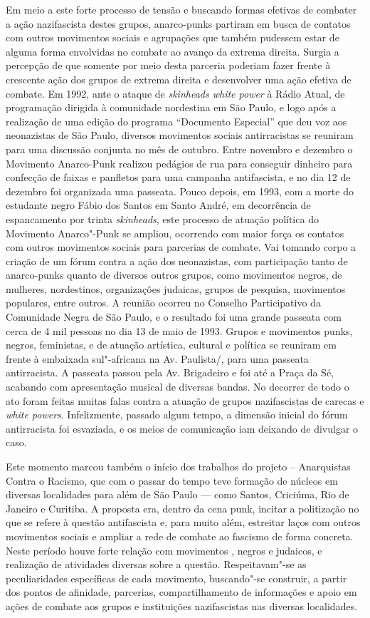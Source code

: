 Em meio a este forte processo de tensão e buscando formas efetivas de combater a ação nazifascista destes grupos, anarco-punks partiram em busca de contatos com outros movimentos sociais e agrupações que também pudessem estar de alguma forma envolvidas no combate ao avanço da extrema direita. Surgia a percepção de que somente por meio desta parceria poderiam fazer frente à crescente ação dos grupos de extrema direita e desenvolver uma ação efetiva de combate. Em 1992, ante o ataque de \emph{skinheads white power} à Rádio Atual, de programação dirigida à comunidade nordestina em São Paulo, e logo após a realização de uma edição do programa ``Documento Especial'' que deu voz aos neonazistas de São Paulo, diversos movimentos sociais antirracistas se reuniram para uma discussão conjunta no mês de outubro. Entre novembro e dezembro o Movimento Anarco-Punk realizou pedágios de rua para conseguir dinheiro para confecção de faixas e panfletos para uma campanha antifascista, e no dia 12 de dezembro foi organizada uma passeata. Pouco depois, em 1993, com a morte do estudante negro Fábio dos Santos em Santo André, em decorrência de espancamento por trinta \emph{skinheads}, este processo de atuação política do Movimento Anarco"-Punk se ampliou, ocorrendo com maior força os contatos com outros movimentos sociais para parcerias de combate. Vai tomando corpo a criação de um fórum contra a ação dos neonazistas, com participação tanto de anarco-punks quanto de diversos outros grupos, como movimentos negros, de mulheres, nordestinos, organizações judaicas, grupos de pesquisa, movimentos populares, entre outros. A reunião ocorreu no Conselho Participativo da Comunidade Negra de São Paulo, e o resultado foi uma grande passeata com cerca de 4 mil pessoas no dia 13 de maio de 1993. Grupos e movimentos punks, negros, feministas, e de atuação artística, cultural e política se reuniram em frente à embaixada sul"-africana na Av. Paulista/, para uma passeata antirracista. A passeata passou pela Av. Brigadeiro e foi até a Praça da Sé, acabando com apresentação musical de diversas bandas.  No decorrer de todo o ato foram feitas muitas falas contra a atuação de grupos nazifascistas de carecas e \emph{white powers}. Infelizmente, passado algum tempo, a dimensão inicial do fórum antirracista foi esvaziada, e os meios de comunicação iam deixando de divulgar o caso.

Este momento marcou também o início dos trabalhos do projeto  -- Anarquistas Contra o Racismo, que com o passar do tempo teve formação  de núcleos em diversas localidades para além de São Paulo --- como Santos, Criciúma, Rio de Janeiro e Curitiba. A proposta era, dentro da cena punk, incitar a politização no que se refere à questão antifascista e, para muito além, estreitar laços com outros movimentos sociais e ampliar a rede de combate ao fascismo de forma concreta. Neste período houve forte relação com movimentos , negros e judaicos, e realização de atividades diversas sobre a questão. Respeitavam"-se as peculiaridades específicas de cada movimento, buscando"-se construir, a partir dos pontos de afinidade, parcerias, compartilhamento de informações e apoio em ações de combate aos grupos e instituições nazifascistas nas diversas localidades.

